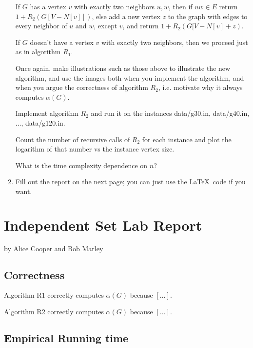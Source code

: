\documentclass{tufte-handout}
\begin{document}
\begin{enumerate}
  If $G$ has a vertex $v$ with exactly two neighbors $u,w$, then if
  $uw\in E$ return $1+R_2(G[V-N[v]])$, else add a new vertex $z$ to
  the graph with edges to every neighbor of $u$ and $w$, except $v$,
  and return $1+R_2(G[V-N[v]+z)$.

  If $G$ doesn't have a vertex $v$ with exactly two neighbors, then we
  proceed just as in algorithm $R_1$.
 
  Once again, make illustrations such as those above to illustrate the
  new algorithm, and use the images both when you implement the
  algorithm, and when you argue the correctness of algorithm $R_2$,
  i.e. motivate why it always computes $\alpha(G)$.
 
 Implement algorithm $R_2$ and run it on the instances
  data/g30.in, data/g40.in, $\ldots$, data/g120.in.

  Count the number of recursive calls of $R_2$ for each instance and plot the
  logarithm of that number vs the instance vertex size. 
  
  What is the time complexity dependence on $n$?

\item Fill out the report on the next page; you can just use the
  \LaTeX\ code if you want.
\end{enumerate}

\newpage


\newpage
\section{Independent Set Lab Report}


by Alice Cooper and Bob Marley

\subsection{Correctness}
Algorithm R1 correctly computes $\alpha(G)$ because $[\ldots]$.

\noindent
Algorithm R2 correctly computes $\alpha(G)$ because $[\ldots]$.

\subsection{Empirical Running time}
\end{document}
